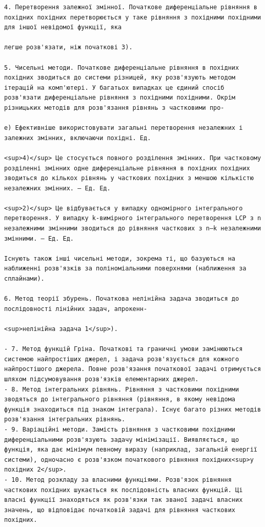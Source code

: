 \documentclass[
]{article}
\begin{document}
\begin{verbatim}
4. Перетворення залежної змінної. Початкове диференціальне рівняння в похідних похідних перетворюється у таке рівняння з похідними похідними для іншої невідомої функції, яка

легше розв'язати, ніж початкові 3).

5. Чисельні методи. Початкове диференціальне рівняння в похідних похідних зводиться до системи різницей, яку розв'язують методом ітерацій на комп'ютері. У багатьох випадках це єдиний спосіб розв'язати диференціальне рівняння з похідними похідними. Окрім різницьких методів для розв'язання рівнянь з частковими про-

e) Ефективніше використовувати загальні перетворення незалежних і залежних змінних, включаючи похідні. Ед.

<sup>4)</sup> Це стосується повного розділення змінних. При частковому розділенні змінних одне диференціальне рівняння в похідних похідних зводиться до кількох рівнянь у часткових похідних з меншою кількістю незалежних змінних. — Ед. Ед.

<sup>2)</sup> Це відбувається у випадку одномірного інтегрального перетворення. У випадку k-вимірного інтегрального перетворення LCP з n незалежними змінними зводиться до рівняння часткових з n—k незалежними змінними. — Ед. Ед.

Існують також інші чисельні методи, зокрема ті, що базуються на наближенні розв'язків за поліноміальними поверхнями (наближення за сплайнами).

6. Метод теорії збурень. Початкова нелінійна задача зводиться до послідовності лінійних задач, апрокенн-

<sup>нелінійна задача 1</sup>).

- 7. Метод функцій Гріна. Початкові та граничні умови замінюються системою найпростіших джерел, і задача розв'язується для кожного найпростішого джерела. Повне розв'язання початкової задачі отримується шляхом підсумовування розв'язків елементарних джерел.
- 8. Метод інтегральних рівнянь. Рівняння з частковими похідними зводяться до інтегрального рівняння (рівняння, в якому невідома функція знаходиться під знаком інтеграла). Існує багато різних методів розв'язання інтегральних рівнянь.
- 9. Варіаційні методи. Замість рівняння з частковими похідними диференціальними розв'язують задачу мінімізації. Виявляється, що функція, яка дає мінімум певному виразу (наприклад, загальній енергії системи), одночасно є розв'язком початкового рівняння похідних<sup>у похідних 2</sup>.
- 10. Метод розкладу за власними функціями. Розв'язок рівняння часткових похідних шукається як послідовність власних функцій. Ці власні функції знаходяться як розв'язки так званої задачі власних значень, що відповідає початковій задачі для рівняння часткових похідних.


\end{verbatim}
\end{document}
